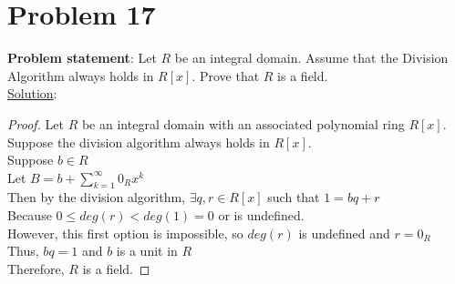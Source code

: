 \documentclass{article} %
\begin{document}
\section*{Problem 17}
\textbf{Problem statement}: Let $R$ be an integral domain.  Assume that the Division Algorithm always holds in $R[x]$.  Prove that $R$ is a field.
\\

\underline{Solution}: 
\begin{addmargin}[1em]{0em}
\begin{proof}
Let $R$ be an integral domain with an associated polynomial ring $R[x]$.
\\Suppose the division algorithm always holds in $R[x]$.
\\Suppose $b \in R$
\\Let $B = b + \sum_{k=1}^{\infty}{0_Rx^k}$
\\Then by the division algorithm,  $\exists q, r \in R[x]$ such that $1 = bq + r$
\\Because $0 \leq deg(r) < deg(1) = 0$ or is undefined.
\\However, this first option is impossible, so $deg(r)$ is undefined and $r = 0_R$
\\Thus, $bq = 1$ and $b$ is a unit in $R$
\\Therefore, $R$ is a field.
\end{proof}
\end{addmargin}
\end{document}
